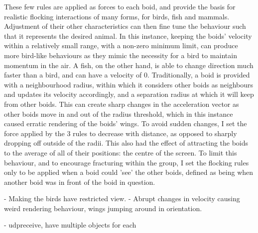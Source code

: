 \documentclass[journal, a4paper]{IEEEtran}
\begin{document}
These few rules are applied as forces to each boid, and provide the basis for realistic flocking interactions of many forms, for birds, fish and mammals. Adjustment of their other characteristics can then fine tune the behaviour such that it represents the desired animal. In this instance, keeping the boids' velocity within a relatively small range, with a non-zero minimum limit, can produce more bird-like behaviours as they mimic the necessity for a bird to maintain momentum in the air. A fish, on the other hand, is able to change direction much faster than a bird, and can have a velocity of 0.
Traditionally, a boid is provided with a neighbourhood radius, within which it considers other boids as neighbours and updates its velocity accordingly, and a separation radius at which it will keep from other boids. This can create sharp changes in the acceleration vector as other boids move in and out of the radius threshold, which in this instance caused erratic rendering of the boids' wings. To avoid sudden changes, I set the force applied by the 3 rules to decrease with distance, as opposed to sharply dropping off outside of the radii. This also had the effect of attracting the boids to the average of all of their positions: the centre of the screen. To limit this behaviour, and to encourage fracturing within the group, I set the flocking rules only to be applied when a boid could 'see' the other boids, defined as being when another boid was in front of the boid in question.

- Making the birds have restricted view.
- Abrupt changes in velocity causing weird rendering behaviour, wings jumping around in orientation.


- udpreceive, have multiple objects for each
\end{document}
